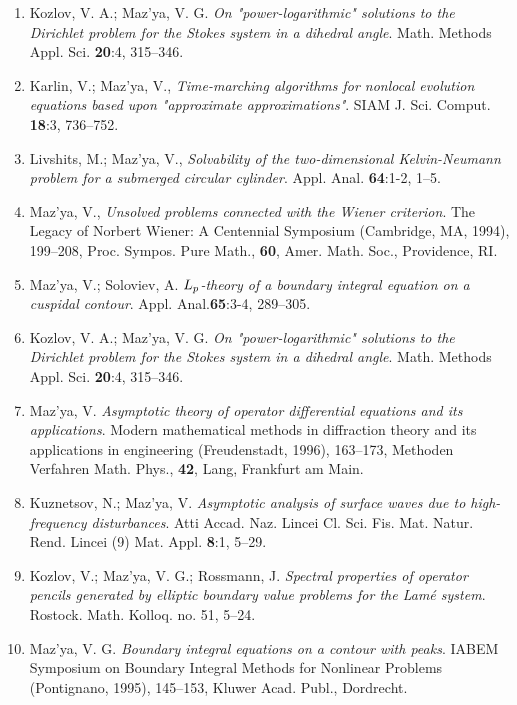 \documentclass{article}
\begin{document}
\begin{enumerate}
{\bf 1997}
\item Kozlov, V. A.; Maz'ya, V. G. {\it On "power-logarithmic"
solutions to
the Dirichlet problem
for the Stokes system in a dihedral angle}. Math. Methods Appl. Sci.
{\bf
20}:4, 315--346.
\item Karlin, V.; Maz'ya, V., {\it Time-marching algorithms for
nonlocal
evolution
equations based upon "approximate approximations"}. SIAM J. Sci.
Comput.
{\bf 18}:3, 736--752.
\item Livshits, M.; Maz'ya, V., {\it Solvability of the
two-dimensional
Kelvin-Neumann problem for a
submerged circular cylinder}. Appl. Anal. {\bf 64}:1-2, 1--5.
\item Maz'ya, V., {\it Unsolved problems connected with the Wiener
criterion}. The Legacy of
Norbert Wiener: A Centennial Symposium (Cambridge, MA, 1994),
199--208,
Proc. Sympos. Pure Math., {\bf 60}, Amer. Math. Soc.,
Providence, RI.
\item Maz'ya, V.; Soloviev, A. {\it $L\sb p$-theory of a boundary
integral
equation on a cuspidal contour}.
  Appl. Anal.{\bf  65}:3-4, 289--305.
\item Kozlov, V. A.; Maz'ya, V. G. {\it On "power-logarithmic"
solutions to
the Dirichlet problem for
the Stokes system in a dihedral angle}. Math. Methods Appl. Sci. {\bf
20}:4, 315--346.
\item Maz'ya, V. {\it Asymptotic theory of operator differential
equations
and its applications}.
Modern mathematical methods in diffraction theory and its applications
in
engineering (Freudenstadt, 1996), 163--173, Methoden
Verfahren Math. Phys., {\bf 42}, Lang, Frankfurt am Main.
\item Kuznetsov, N.; Maz'ya, V. {\it Asymptotic analysis of surface
waves
due to high-frequency
disturbances}. Atti Accad. Naz. Lincei Cl. Sci. Fis. Mat. Natur. Rend.
Lincei (9) Mat. Appl. {\bf 8}:1, 5--29.
\item Kozlov, V.; Maz'ya, V. G.; Rossmann, J. {\it Spectral properties
of
operator pencils generated
by elliptic boundary value problems for the Lam\'e system}. Rostock.
Math.
Kolloq. no. 51, 5--24.
\item Maz'ya, V. G. {\it Boundary integral equations on a contour with
peaks}. IABEM Symposium on Boundary Integral
Methods for Nonlinear Problems (Pontignano, 1995), 145--153, Kluwer
Acad.
Publ., Dordrecht.\hfill\break


\end{enumerate}
\end{document}
